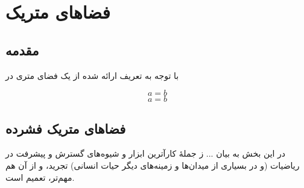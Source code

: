 \chapter{فضاهای متریک }
\thispagestyle{empty}

\section{مقدمه }
با توجه به تعریف ارائه شده از یک  فضای متری در  
\cite{rud}


\begin{equation}
a = b
\end{equation}
\begin{equation}
a = b
\end{equation}


\section{فضاهای متریک فشرده }
در این  بخش به بیان ...
ز جملهٔ کارآترین ابزار و شیوه‌های گسترش و پیشرفت در ریاضیات (و در بسیاری از میدان‌ها و زمینه‌های دیگر حیات انسانی) تجرید، و از آن هم مهم‌تر، تعمیم است.
